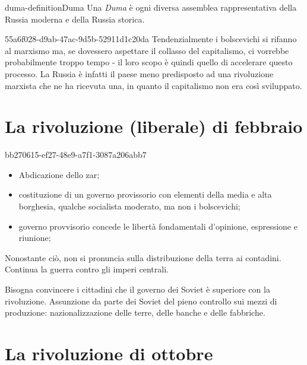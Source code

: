\documentclass[preview]{standalone}
\begin{document}
\begin{snippetdefinition}{duma-definition}{Duma}
    Una \textit{Duma} è ogni diversa assemblea rappresentativa della Russia moderna e della Russia storica.
\end{snippetdefinition}

\begin{snippet}{55a6f028-d9ab-47ac-9d5b-52911d1c20da}
    Tendenzialmente i bolscevichi si rifanno al marxismo ma,
    se dovessero aspettare il collasso del capitalismo, ci vorrebbe probabilmente troppo
    tempo - il loro scopo è quindi quello di accelerare questo processo.
    La Russia è infatti il paese meno predisposto ad una rivoluzione marxista che ne ha ricevuta una,
    in quanto il capitalismo non era così sviluppato.
\end{snippet}

\section{La rivoluzione (liberale) di febbraio}

\begin{snippet}{bb270615-ef27-48e9-a7f1-3087a206abb7}
    \begin{itemize}
        \item Abdicazione dello zar;
        \item costituzione di un governo provissorio con elementi della media e alta borghesia, qualche socialista moderato, ma non i bolscevichi;
        \item governo provvisorio concede le libertà fondamentali d'opinione, espressione e riunione;
    \end{itemize}
    
    Nonostante ciò, non si pronuncia sulla distribuzione della terra ai contadini.
    Continua la guerra contro gli imperi centrali.
    
    
    Bisogna convincere i cittadini che il governo dei Soviet è superiore
    con la rivoluzione.
    Assunzione da parte dei Soviet del pieno controllo sui mezzi di produzione: nazionalizzazione delle terre, delle banche e delle fabbriche.
\end{snippet}

\section{La rivoluzione di ottobre}
\end{document}
